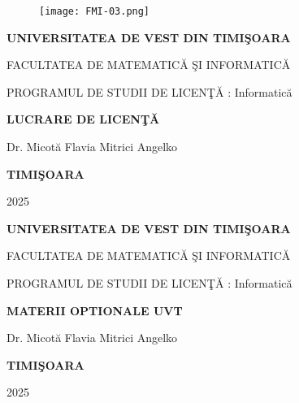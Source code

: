 \documentclass[12pt,a4paper]{report}
\begin{document}
\thispagestyle{empty}
\begin{center}
\begin{figure}[h!]
\vspace{-20pt}
\begin{center}
\texttt{[image: FMI-03.png]}
\end{center}
\end{figure}

{\large{\bf UNIVERSITATEA DE VEST DIN TIMI\c SOARA

FACULTATEA DE MATEMATIC\u A \c SI INFORMATIC\u A

PROGRAMUL DE STUDII DE LICEN\c T\u A : Informatic\u a  }}

\vspace{120pt}
{\huge {\bf LUCRARE DE LICEN\c T\u A}}

\vspace{150pt}
\end{center}

{\large{}

\noindent Dr. Micot\u a Flavia \hfill Mitrici Angelko}

\vfill
\begin{center}
{\bf TIMI\c SOARA

2025}
\end{center}
\newpage

\thispagestyle{empty}
\begin{center}
\begin{figure}[h!]
\vspace{-20pt}
\begin{center}
\end{center}
\end{figure}


{\large{\bf UNIVERSITATEA DE VEST DIN TIMI\c SOARA

FACULTATEA DE MATEMATIC\u A \c SI INFORMATIC\u A

PROGRAMUL DE STUDII DE LICEN\c T\u A : Informatic\u a  }}

\vspace{120pt}
{\huge {\bf MATERII OPTIONALE UVT}}

\vspace{150pt}
\end{center}

{\large{}

\noindent Dr. Micot\u a Flavia \hfill Mitrici Angelko}

\vfill
\begin{center}
{\bf TIMI\c SOARA

2025}
\end{center}
\end{document}
